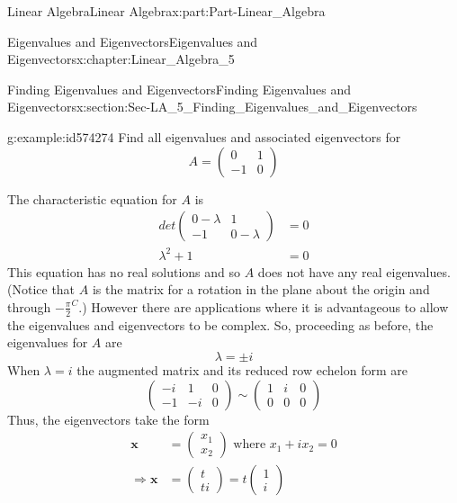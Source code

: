 \documentclass[oneside,10pt,]{book}
\numberwithin{equation}{section}
\newcommand{\amp}{&}
\begin{document}
\begin{partptx}{Linear Algebra}{}{Linear Algebra}{}{}{x:part:Part-Linear_Algebra}
\begin{chapterptx}{Eigenvalues and Eigenvectors}{}{Eigenvalues and Eigenvectors}{}{}{x:chapter:Linear_Algebra_5}
\begin{sectionptx}{Finding Eigenvalues and Eigenvectors}{}{Finding Eigenvalues and Eigenvectors}{}{}{x:section:Sec-LA_5_Finding_Eigenvalues_and_Eigenvectors}
\begin{example}{}{g:example:id574274}%
Find all eigenvalues and associated eigenvectors for%
\begin{equation*}
A=\begin{pmatrix} 0 \amp 1 \\ -1 \amp 0 \end{pmatrix}
\end{equation*}
%
\par\smallskip%
\noindent\hypertarget{g:solution:id574260}{}The characteristic equation for \(A\) is%
\begin{align*}
det\begin{pmatrix} 0-\lambda \amp 1 \\ -1 \amp 0-\lambda \end{pmatrix} \amp =0 \\
\lambda^2+1 \amp =0 
\end{align*}
This equation has no real solutions and so \(A\) does not have any real eigenvalues. (Notice that \(A\) is the matrix for a rotation in the plane about the origin and through \(-\frac{\pi}{2}^C\).) However there are applications where it is advantageous to allow the eigenvalues and eigenvectors to be complex. So, proceeding as before, the eigenvalues for \(A\) are%
\begin{equation*}
\lambda=\pm i
\end{equation*}
When \(\lambda=i\) the augmented matrix and its reduced row echelon form are%
\begin{equation*}
\begin{pmatrix} -i \amp 1 \amp 0 \\ -1 \amp -i \amp 0 \end{pmatrix} \sim \begin{pmatrix} 1 \amp i \amp 0 \\ 0 \amp 0 \amp 0 \end{pmatrix} 
\end{equation*}
Thus, the eigenvectors take the form%
\begin{align*}
\mathbf{x} \amp =\begin{pmatrix} x_1 \\ x_2 \end{pmatrix} \textrm{ where } x_1+ix_2=0 \\
\Rightarrow \mathbf{x} \amp =\begin{pmatrix} t \\ ti \end{pmatrix} = t\begin{pmatrix} 1 \\ i \end{pmatrix}

\end{align*}
\end{example}
\end{sectionptx}
\end{chapterptx}
\end{partptx}
\end{document}
